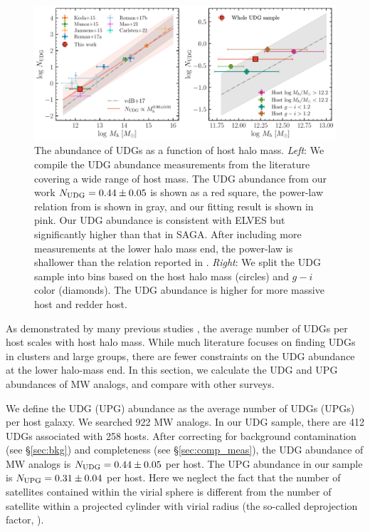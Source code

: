 \documentclass[twocolumn,astrosymb,twocolappendix]{aastex631}
\begin{document}
\begin{CJK*}{UTF8}{gbsn}
\begin{figure}
	\vbox{ 
		\centering
		\includegraphics[width=1\linewidth]{N_UDG_host_mass.pdf}
	}
    \caption{The abundance of UDGs as a function of host halo mass. \textit{Left}: We compile the UDG abundance measurements from the literature covering a wide range of host mass. The UDG abundance from our work $N_{\rm UDG} = 0.44\pm 0.05$ is shown as a red square, the power-law relation from \citet{vdBurg2017} is shown in gray, and our fitting result is shown in pink. Our UDG abundance is consistent with ELVES but significantly higher than that in SAGA. After including more measurements at the lower halo mass end, the power-law is shallower than the relation reported in \citet{vdBurg2017}. \textit{Right}: We split the UDG sample into bins based on the host halo mass (circles) and $g-i$ color (diamonds). The UDG abundance is higher for more massive host and redder host. }
    \label{fig:n_udg}
\end{figure}

As demonstrated by many previous studies \citep[e.g.,][]{vdBurg2016,vdBurg2017,Roman2017a,Karunakaran2022b}, the average number of UDGs per host scales with host halo mass. While much literature focuses on finding UDGs in clusters and large groups, there are fewer constraints on the UDG abundance at the lower halo-mass end. In this section, we calculate the UDG and UPG abundances of MW analogs, and compare with other surveys.

We define the UDG (UPG) abundance as the average number of UDGs (UPGs) per host galaxy. We searched 922 MW analogs. In our UDG sample, there are 412 UDGs associated with 258 hosts. After correcting for background contamination (see \S \ref{sec:bkg}) and completeness (see \S \ref{sec:comp_meas}), the UDG abundance of MW analogs is $N_{\rm UDG} = 0.44\pm 0.05$ per host. The UPG abundance in our sample is $N_{\rm UPG} = 0.31\pm 0.04$ per host. Here we neglect the fact that the number of satellites contained within the virial sphere is different from the number of satellite within a projected cylinder with virial radius (the so-called deprojection factor, \citealt{vdBurg2017}).



\end{CJK*}
\end{document}
